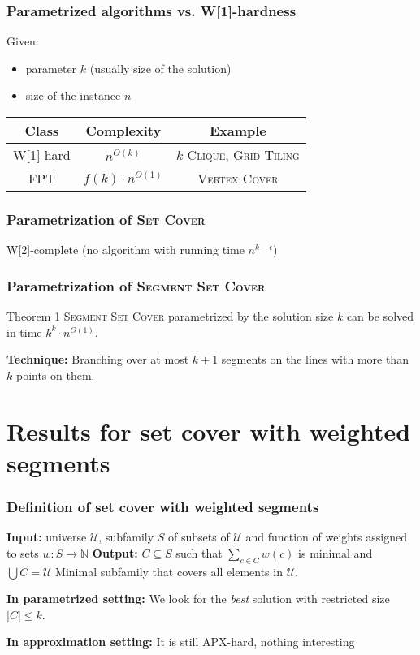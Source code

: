 \documentclass{beamer}
\begin{document}
\begin{frame}
\frametitle{Parametrized algorithms vs. W[1]-hardness}
Given:
\begin{itemize}
\item parameter $k$ (usually size of the solution)
\item size of the instance $n$
\end{itemize}
\bigskip

\begin{tabular}{|c|c|c|}
\hline
\textbf{Class} & \textbf{Complexity} & \textbf{Example}\\
\hline
W[1]-hard & $n^{O(k)}$ & \textsc{$k$-Clique}, \textsc{Grid Tiling}\\
\hline
FPT & $f(k) \cdot n^{O(1)}$ & \textsc{Vertex Cover}\\
\hline
\end{tabular}

\end{frame}

\begin{frame}
\frametitle{Parametrization of \textsc{Set Cover}}
W[2]-complete (no algorithm with running time $n^{k-\epsilon}$)
\end{frame}

\begin{frame}
\frametitle{Parametrization of \textsc{Segment Set Cover}}
\begin{block}{Theorem 1}
	\textsc{Segment Set Cover} parametrized by the solution size $k$
	can be solved in time $k^k \cdot n^{O(1)}$.
\end{block}

\textbf{Technique:} Branching over at most $k+1$
segments on the lines with more than $k$ points on them.
\end{frame}

\section{Results for set cover with weighted segments} 

\begin{frame}
\frametitle{Definition of set cover with weighted segments}

\textbf{Input:} universe $\mathcal{U}$,
subfamily $S$ of subsets of $\mathcal{U}$
and function of weights assigned to sets $w : S \rightarrow \mathbb{N}$
\newline
\textbf{Output:} $C \subseteq S$ such that $\sum_{c \in C} w(c)$ is minimal and
$\bigcup C = \mathcal{U}$
\newline
Minimal subfamily that covers all elements in $\mathcal{U}$.

\bigskip
\textbf{In parametrized setting:}
We look for the \textit{best} solution with restricted size $|C| \le k$.

\textbf{In approximation setting:}
It is still APX-hard, nothing interesting


\end{frame}
\end{document}
